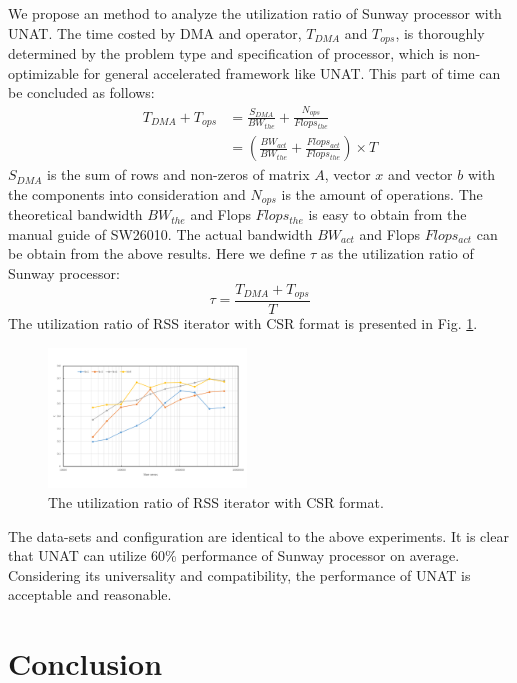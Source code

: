 \documentclass[conference]{IEEEtran}
\begin{document}
We propose an method to analyze the utilization ratio of Sunway processor with UNAT. The time costed by DMA and operator, $T_{DMA}$ and $T_{ops}$, is thoroughly determined by the problem type and specification of processor, which is non-optimizable for general accelerated framework like UNAT. This part of time can be concluded as follows:
\begin{equation}
\begin{aligned}
    T_{DMA}+T_{ops}&=\frac{S_{DMA}}{BW_{the}}+\frac{N_{ops}}{Flops_{the}} \\
    &=(\frac{BW_{act}}{BW_{the}}+\frac{Flops_{act}}{Flops_{the}})\times T
\end{aligned}
\end{equation}
$S_{DMA}$ is the sum of rows and non-zeros of matrix $A$, vector $x$ and vector $b$ with the components into consideration and $N_{ops}$ is the amount of operations. The theoretical bandwidth $BW_{the}$ and Flops $Flops_{the}$ is easy to obtain from the manual guide of SW26010. The actual bandwidth $BW_{act}$ and Flops $Flops_{act}$ can be obtain from the above results. Here we define $\tau$ as the utilization ratio of Sunway processor:
\begin{equation}
    \tau =\frac{T_{DMA}+T_{ops}}{T}
\end{equation}
The utilization ratio of RSS iterator with CSR format is presented in Fig. \ref{tau}.
\begin{figure}[tbp]
\centerline{\includegraphics[width=0.47\textwidth]{tau.pdf}}
\caption{The utilization ratio of RSS iterator with CSR format.}
\label{tau}
\end{figure}
The data-sets and configuration are identical to the above experiments. It is clear that UNAT can utilize 60\% performance of Sunway processor on average. Considering its universality and compatibility, the performance of UNAT is acceptable and reasonable.

\section{Conclusion}
\end{document}

